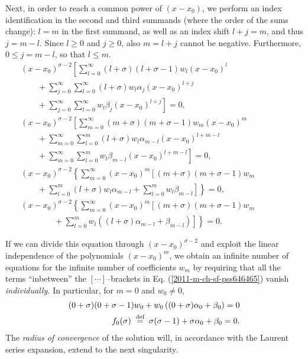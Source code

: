 Next, in order  to reach a  common power of $(x-x_0)$,
we perform an index identification  in the second and third summands (where the order of the sums change):
$l=m$ in the first summand, as well as an index shift
$
l+j =m
$, and thus
$j= m-l$.
Since
$l\ge 0$  and  $j\ge 0$, also $m=l+j$ cannot be negative.
Furthermore,
$0\le j = m-l$, so that  $l\le m$.
\begin{equation}
\begin{split}
(x-x_0)^{\sigma-2} \left[  \sum_{l=0}^\infty
({l + \sigma})({l + \sigma-1})   w_l (x-x_0)^{l} \right.    \qquad \qquad
\\
\qquad + \sum_{j=0}^\infty  \sum_{l=0}^\infty ({l + \sigma})   w_l    \alpha_j (x-x_0)^{l+j}  \qquad \qquad
\\
\left.
\qquad + \sum_{j=0}^\infty  \sum_{l=0}^\infty  w_l  \beta_j (x-x_0)^{l+j}  \right]
    =   0,\\
(x-x_0)^{\sigma-2} \left[   \sum_{m=0}^\infty
({m + \sigma})({m + \sigma-1})   w_m (x-x_0)^{m} \right. \qquad \qquad \\
\qquad + \sum_{m=0}^\infty  \sum_{l=0}^m ({l + \sigma})   w_l    \alpha_{m-l} (x-x_0)^{l+m-l}  \qquad \qquad
\\
\left.
\qquad + \sum_{m=0}^\infty  \sum_{l=0}^m  w_l  \beta_{m-l} (x-x_0)^{l+m-l}     \right]
    =   0,\\
(x-x_0)^{\sigma-2}\left\{     \sum_{m=0}^\infty
(x-x_0)^{m} \left[
({m + \sigma})({m + \sigma-1})   w_m \right.\right. \qquad \qquad \\
   \left.  \left.  \qquad + \sum_{l=0}^m  ({l + \sigma})   w_l   \alpha_{m-l}
 +  \sum_{l=0}^m  w_l \beta_{m-l}
\right]
\right\}
    =   0,    \\
(x-x_0)^{\sigma-2}\left\{     \sum_{m=0}^\infty
(x-x_0)^{m} \left[
({m + \sigma})({m + \sigma-1})   w_m
\right.
\right.   \qquad \qquad
 \\
\qquad \qquad +
\left.
\left.
 \sum_{l=0}^m w_l  \left( ({l + \sigma}) \alpha_{m-l}
 + \beta_{m-l}
\right)
\right]
\right\}
    =   0.
\end{split}
\label{2011-m-ch-sf-pss646465}
\end{equation}

If we can divide this equation through  $(x-x_0)^{\sigma-2}$
and exploit the linear independence of the polynomials $(x-x_0)^{m}$,
we obtain an infinite number of equations for the infinite number of coefficients $w_m$
by requiring that all the terms ``inbetween'' the $[\cdots ]$--brackets in Eq. (\ref{2011-m-ch-sf-pss646465})
vanish {\em individually.}
In particular, for $m=0$ and $w_0\neq 0$,
\begin{equation}
\begin{split}
({0+ \sigma})({0 + \sigma-1})   w_0
+
 w_0  \left( ({0 + \sigma}) \alpha_{0} + \beta_{0}\right)
    =   0\\
 f_0(\sigma ) \stackrel{{\tiny \textrm{ def }}}{=} \sigma({\sigma-1}) +  \sigma \alpha_{0} + \beta_{0}           =   0
.
\end{split}
\label{2011-m-ch-sf-pss2sigma}
\end{equation}
The {\em radius of convergence} of the solution will,
in accordance with the Laurent series expansion, extend to the next singularity.

